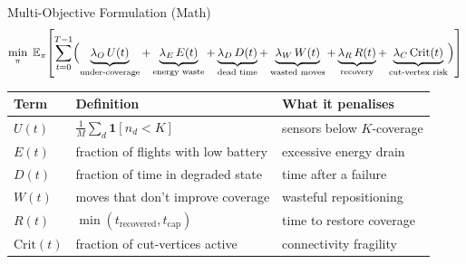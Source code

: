 \documentclass[aspectratio=169,12pt]{beamer}
\begin{document}
\begin{frame}{Multi-Objective Formulation (Math)}
\[
\min_{\pi}\;
\mathbb{E}_{\pi}
\!\left[
\sum_{t=0}^{T-1}
\Bigl(
  \underbrace{\lambda_O\, U(t)}_{\text{under-coverage}}
  + \underbrace{\lambda_E\, E(t)}_{\text{energy waste}}
  + \underbrace{\lambda_D\, D(t)}_{\text{dead time}}
  + \underbrace{\lambda_W\, W(t)}_{\text{wasted moves}}
  + \underbrace{\lambda_R\, R(t)}_{\text{recovery}}
  + \underbrace{\lambda_C\, \text{Crit}(t)}_{\text{cut-vertex risk}}
\Bigr)
\right]
\]

\vspace{0.4em}
\begin{tabular}{@{}lll@{}}
\toprule
\textbf{Term} & \textbf{Definition} & \textbf{What it penalises} \\
\midrule
$U(t)$ & $\frac{1}{M}\sum_d \mathbf{1}[n_d{<}K]$ & sensors below $K$-coverage \\
$E(t)$ & fraction of flights with low battery & excessive energy drain \\
$D(t)$ & fraction of time in degraded state & time after a failure \\
$W(t)$ & moves that don't improve coverage & wasteful repositioning \\
$R(t)$ & $\min(t_{\text{recovered}}, t_{\text{cap}})$ & time to restore coverage \\
$\text{Crit}(t)$ & fraction of cut-vertices active & connectivity fragility \\
\bottomrule
\end{tabular}
\end{frame}

\end{document}
